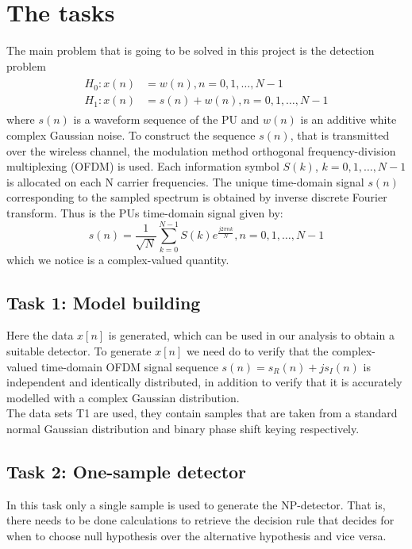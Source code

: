 \section{The tasks}\label{sec:task}
The main problem that is going to be solved in this project is the detection problem
\begin{align}
\begin{split}
	H_0: x(n) & = w(n), n = 0, 1, \dots, N-1\\
	H_1: x(n) & = s(n) + w(n), n = 0, 1, \dots, N-1
\end{split}
\end{align}\label{eq:detection_problem}
where $s(n)$ is a waveform sequence of the PU and $w(n)$ is an additive white complex Gaussian noise.
To construct the sequence $s(n)$, that is transmitted over the wireless channel, the modulation method orthogonal frequency-division multiplexing (OFDM) is used. Each information symbol $S(k)$, $k=0,1,\dots,N-1$ is allocated on each N carrier frequencies. The unique time-domain signal $s(n)$ corresponding to the sampled spectrum is obtained by inverse discrete Fourier transform. Thus is the PUs time-domain signal given by:
\begin{equation}
	s(n) = \frac{1}{\sqrt{N}}\sum_{k=0}^{N-1}S(k)e^{\frac{j2\pi nk}{N}}, n = 0,1,\dots,N-1
\end{equation}
which we notice is a complex-valued quantity.

\subsection{Task 1: Model building}
Here the data $x[n]$ is generated, which can be used in our analysis to obtain a suitable detector. To generate $x[n]$ we need do to verify that the complex-valued time-domain OFDM signal sequence $s(n) = s_R(n)+js_I(n)$ is independent and identically distributed, in addition to verify that it is accurately modelled with a complex Gaussian distribution.\\
The data sets T1 are used, they contain samples that are taken from a standard normal Gaussian distribution and binary phase shift keying respectively.

\subsection{Task 2: One-sample detector}
In this task only a single sample is used to generate the NP-detector. That is, there needs to be done calculations to retrieve the decision rule that decides for when to choose null hypothesis over the alternative hypothesis and vice versa.


